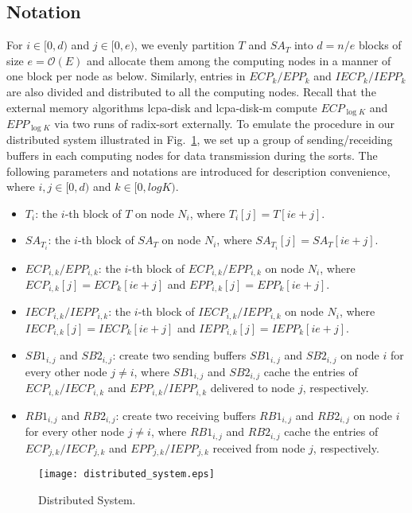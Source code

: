 \documentclass[article]{IEEEtran}
\theoremstyle{definition}
\theoremstyle{remark}
\numberwithin{equation}{section}
\begin{document}
\subsection{Notation}

For $i\in [0,d)$ and $j\in [0,e)$, we evenly partition $T$ and $SA_T$ into $d=n/e$ blocks of size $e=\mathcal{O}(E)$ and allocate them among the computing nodes in a manner of one block per node as below. Similarly, entries in $ECP_k/EPP_k$ and $IECP_k/IEPP_k$ are also divided and distributed to all the computing nodes. Recall that the external memory algorithms lcpa-disk and lcpa-disk-m compute $ECP_{\log K}$ and $EPP_{\log K}$ via two runs of radix-sort externally. To emulate the procedure in our distributed system illustrated in Fig.~\ref{fig:distributed_system}, we set up a group of sending/receiding buffers in each computing nodes for data transmission during the sorts. The following parameters and notations are introduced for description convenience, where $i,j\in [0,d)$ and $k\in [0,logK)$.

\begin{itemize}
\item $T_i$: the $i$-th block of $T$ on node $N_i$, where $T_i[j] = T[ie+j]$.
\item $SA_{T_i}$: the $i$-th block of $SA_T$ on node $N_i$, where $SA_{T_i}[j] = SA_T[ie+j]$.
\item $ECP_{i,k}/EPP_{i,k}$: the $i$-th block of $ECP_{i,k}/EPP_{i,k}$ on node $N_i$, where $ECP_{i,k}[j] = ECP_k[ie+j]$ and $EPP_{i,k}[j] =  EPP_k[ie+j]$.
\item $IECP_{i,k}/IEPP_{i,k}$: the $i$-th block of $IECP_{i,k}/IEPP_{i,k}$ on node $N_i$, where $IECP_{i,k}[j] = IECP_k[ie+j]$ and $IEPP_{i,k}[j] = IEPP_k[ie+j]$.
\item $SB1_{i,j}$ and $SB2_{i,j}$: create two sending buffers $SB1_{i,j}$ and $SB2_{i,j}$ on node $i$ for every other node $j\ne i$, where $SB1_{i,j}$ and $SB2_{i,j}$ cache the entries of $ECP_{i,k}/IECP_{i,k}$ and $EPP_{i,k}/IEPP_{i,k}$ delivered to node $j$, respectively.
\item $RB1_{i,j}$ and $RB2_{i,j}$: create two receiving buffers $RB1_{i,j}$ and $RB2_{i,j}$ on node $i$ for every other node $j\ne i$, where $RB1_{i,j}$ and $RB2_{i,j}$ cache the entries of $ECP_{j,k}/IECP_{j,k}$ and $EPP_{j,k}/IEPP_{j,k}$ received from node $j$, respectively.
\end{itemize}

\begin{figure}[hbtp]
  \centering
  \texttt{[image: distributed\_system.eps]}\\
  \caption{Distributed System.}\label{fig:distributed_system}
\end{figure}
\end{document}
